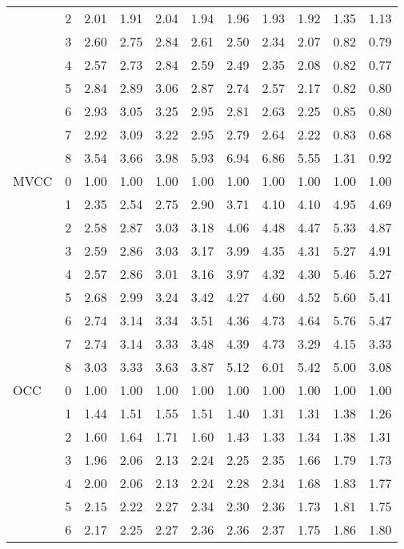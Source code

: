 \begin{tabular}{llrrrrrrrrr}
       & 2 & 2.01 & 1.91 & 2.04 & 1.94 & 1.96 & 1.93 & 1.92 & 1.35 & 1.13 \\
       & 3 & 2.60 & 2.75 & 2.84 & 2.61 & 2.50 & 2.34 & 2.07 & 0.82 & 0.79 \\
       & 4 & 2.57 & 2.73 & 2.84 & 2.59 & 2.49 & 2.35 & 2.08 & 0.82 & 0.77 \\
       & 5 & 2.84 & 2.89 & 3.06 & 2.87 & 2.74 & 2.57 & 2.17 & 0.82 & 0.80 \\
       & 6 & 2.93 & 3.05 & 3.25 & 2.95 & 2.81 & 2.63 & 2.25 & 0.85 & 0.80 \\
       & 7 & 2.92 & 3.09 & 3.22 & 2.95 & 2.79 & 2.64 & 2.22 & 0.83 & 0.68 \\
       & 8 & 3.54 & 3.66 & 3.98 & 5.93 & 6.94 & 6.86 & 5.55 & 1.31 & 0.92 \\
MVCC & 0 & 1.00 & 1.00 & 1.00 & 1.00 & 1.00 & 1.00 & 1.00 & 1.00 & 1.00 \\
       & 1 & 2.35 & 2.54 & 2.75 & 2.90 & 3.71 & 4.10 & 4.10 & 4.95 & 4.69 \\
       & 2 & 2.58 & 2.87 & 3.03 & 3.18 & 4.06 & 4.48 & 4.47 & 5.33 & 4.87 \\
       & 3 & 2.59 & 2.86 & 3.03 & 3.17 & 3.99 & 4.35 & 4.31 & 5.27 & 4.91 \\
       & 4 & 2.57 & 2.86 & 3.01 & 3.16 & 3.97 & 4.32 & 4.30 & 5.46 & 5.27 \\
       & 5 & 2.68 & 2.99 & 3.24 & 3.42 & 4.27 & 4.60 & 4.52 & 5.60 & 5.41 \\
       & 6 & 2.74 & 3.14 & 3.34 & 3.51 & 4.36 & 4.73 & 4.64 & 5.76 & 5.47 \\
       & 7 & 2.74 & 3.14 & 3.33 & 3.48 & 4.39 & 4.73 & 3.29 & 4.15 & 3.33 \\
       & 8 & 3.03 & 3.33 & 3.63 & 3.87 & 5.12 & 6.01 & 5.42 & 5.00 & 3.08 \\
OCC & 0 & 1.00 & 1.00 & 1.00 & 1.00 & 1.00 & 1.00 & 1.00 & 1.00 & 1.00 \\
       & 1 & 1.44 & 1.51 & 1.55 & 1.51 & 1.40 & 1.31 & 1.31 & 1.38 & 1.26 \\
       & 2 & 1.60 & 1.64 & 1.71 & 1.60 & 1.43 & 1.33 & 1.34 & 1.38 & 1.31 \\
       & 3 & 1.96 & 2.06 & 2.13 & 2.24 & 2.25 & 2.35 & 1.66 & 1.79 & 1.73 \\
       & 4 & 2.00 & 2.06 & 2.13 & 2.24 & 2.28 & 2.34 & 1.68 & 1.83 & 1.77 \\
       & 5 & 2.15 & 2.22 & 2.27 & 2.34 & 2.30 & 2.36 & 1.73 & 1.81 & 1.75 \\
       & 6 & 2.17 & 2.25 & 2.27 & 2.36 & 2.36 & 2.37 & 1.75 & 1.86 & 1.80 \\

\end{tabular}
